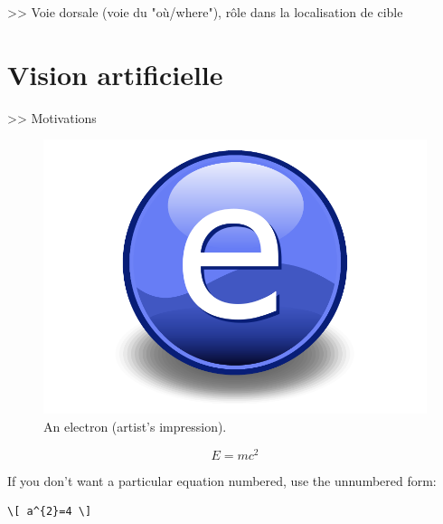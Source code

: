 >> Voie dorsale (voie du "où/where"), rôle dans la localisation de cible\\


\section{Vision artificielle}
>> Motivations

\begin{figure}[th]
\centering
\includegraphics{Figures/Electron}
\decoRule %
\caption[Figure  1]{An electron (artist's impression).}
\label{fig:Electron}
\end{figure}

\begin{equation}
E = mc^{2}
\label{eqn:Einstein}
\end{equation}

If you don't want a particular equation numbered, use the unnumbered form:
\begin{verbatim}
\[ a^{2}=4 \]
\end{verbatim}
